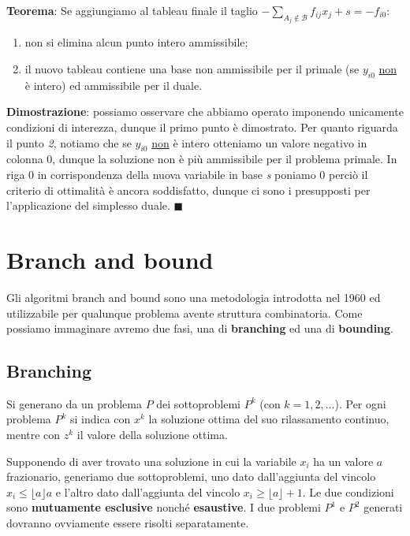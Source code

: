 \documentclass[11pt, oneside]{book}
\begin{document}
{\bf Teorema}: Se aggiungiamo al tableau finale il taglio
$-\sum\limits_{A_j \not\in \mathcal{B}} f_{ij} x_j + s = -f_{i0}$:

\begin{enumerate}
\item non si elimina alcun punto intero ammissibile;
\item il nuovo tableau contiene una base non ammissibile per il
  primale (se $y_{i0}$ \underline{non} \`e intero) ed ammissibile per
  il duale.
\end{enumerate}
{\bf Dimostrazione}: possiamo osservare che abbiamo operato imponendo
unicamente condizioni di interezza, dunque il primo punto \`e
dimostrato. Per quanto riguarda il punto {\em 2}, notiamo che se
$y_{i0}$ \underline{non} \`e intero otteniamo un valore negativo in
colonna 0, dunque la soluzione non \`e pi\`u ammissibile per il
problema primale. In riga 0 in corrispondenza della nuova variabile in
base {\em s} poniamo 0 perci\`o il criterio di ottimalit\`a \`e ancora
soddisfatto, dunque ci sono i presupposti per l'applicazione del
simplesso duale. $\blacksquare$

\section{Branch and bound}

Gli algoritmi branch and bound sono una metodologia introdotta nel
1960 ed utilizzabile per qualunque problema avente struttura
combinatoria. Come possiamo immaginare avremo due fasi, una di {\bf
  branching} ed una di {\bf bounding}.

\subsection{Branching}

Si generano da un problema $P$ dei sottoproblemi $P^k$ (con
$k=1,2,\dots$). Per ogni problema $P^k$ si indica con $x^k$ la
soluzione ottima del suo rilassamento continuo, mentre con $z^k$ il
valore della soluzione ottima.

\par\bigskip

Supponendo di aver trovato una soluzione in cui la variabile $x_i$ ha
un valore $a$ frazionario, generiamo due sottoproblemi, uno dato
dall'aggiunta del vincolo $x_i \leq \lfloor a \rfloor a$ e l'altro
dato dall'aggiunta del vincolo $x_i \geq \lfloor a \rfloor + 1$. Le
due condizioni sono {\bf mutuamente esclusive} nonch\'e {\bf
  esaustive}. I due problemi $P^1$ e $P^2$ generati dovranno
ovviamente essere risolti separatamente. 
\end{document}
